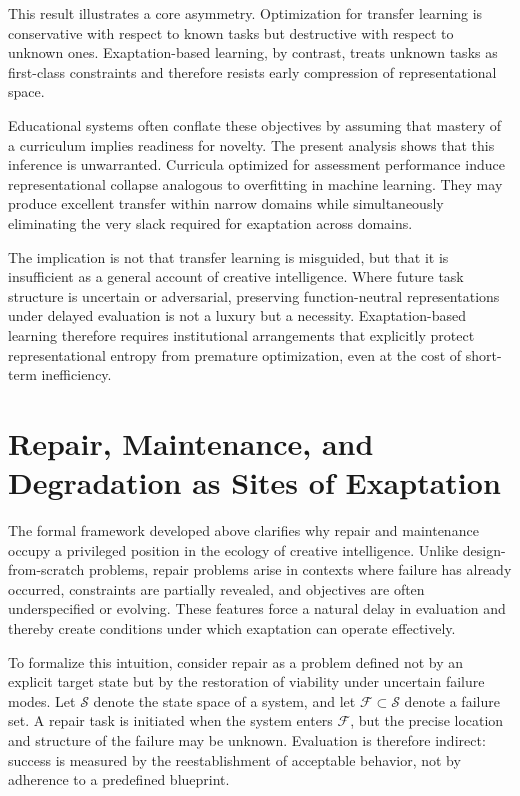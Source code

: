\documentclass[11pt]{article}
\theoremstyle{definition}
\begin{document}
This result illustrates a core asymmetry. Optimization for transfer learning is conservative with respect to known tasks but destructive with respect to unknown ones. Exaptation-based learning, by contrast, treats unknown tasks as first-class constraints and therefore resists early compression of representational space.

Educational systems often conflate these objectives by assuming that mastery of a curriculum implies readiness for novelty. The present analysis shows that this inference is unwarranted. Curricula optimized for assessment performance induce representational collapse analogous to overfitting in machine learning. They may produce excellent transfer within narrow domains while simultaneously eliminating the very slack required for exaptation across domains.

The implication is not that transfer learning is misguided, but that it is insufficient as a general account of creative intelligence. Where future task structure is uncertain or adversarial, preserving function-neutral representations under delayed evaluation is not a luxury but a necessity. Exaptation-based learning therefore requires institutional arrangements that explicitly protect representational entropy from premature optimization, even at the cost of short-term inefficiency.

\section{Repair, Maintenance, and Degradation as Sites of Exaptation}

The formal framework developed above clarifies why repair and maintenance occupy a privileged position in the ecology of creative intelligence. Unlike design-from-scratch problems, repair problems arise in contexts where failure has already occurred, constraints are partially revealed, and objectives are often underspecified or evolving. These features force a natural delay in evaluation and thereby create conditions under which exaptation can operate effectively.

To formalize this intuition, consider repair as a problem defined not by an explicit target state but by the restoration of viability under uncertain failure modes. Let $\mathcal{S}$ denote the state space of a system, and let $\mathcal{F}\subset \mathcal{S}$ denote a failure set. A repair task is initiated when the system enters $\mathcal{F}$, but the precise location and structure of the failure may be unknown. Evaluation is therefore indirect: success is measured by the reestablishment of acceptable behavior, not by adherence to a predefined blueprint.
\end{document}
